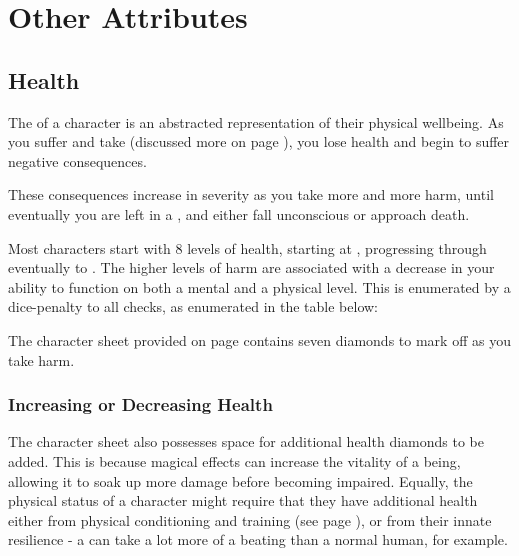 \chapter{Other Attributes}




\section{Health}

The  of a character is an abstracted representation of their physical wellbeing. As you suffer  and take  (discussed more on page \pageref{S:Damage}), you lose health and begin to suffer negative consequences. 

These consequences increase in severity as you take more and more harm, until eventually you are left in a , and either fall unconscious or approach death. 

Most characters start with 8 levels of health, starting at , progressing through  eventually to . The higher levels of harm are associated with a decrease in your ability to function on both a mental and a physical level. This is enumerated by a dice-penalty to all checks, as enumerated in the table below:


The character sheet provided on page \pageref{S:CharacterSheet} contains seven diamonds to mark off as you take harm. 


\subsection{Increasing or Decreasing Health}

The character sheet also possesses space for additional health diamonds to be added. This is because magical effects can increase the vitality of a being, allowing it to soak up more damage before becoming impaired. Equally, the physical status of a character might require that they have additional health either from physical conditioning and training (see page \pageref{S:Progression}), or from their innate resilience - a  can take a lot more of a beating than a normal human, for example. 

